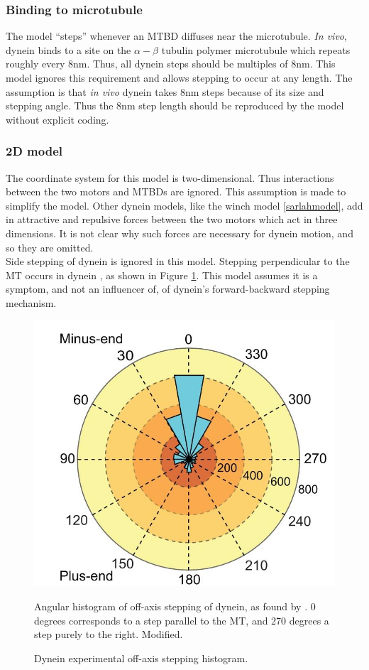 \documentclass[10pt]{article} %
\begin{document}
\subsubsection{Binding to microtubule}
The model ``steps'' whenever an MTBD diffuses near the microtubule. \textit{In vivo}, dynein binds to a site on the $\alpha-\beta$ tubulin polymer microtubule which repeats roughly every 8nm. Thus, all dynein steps should be multiples of $8$nm. This model ignores this requirement and allows stepping to occur at any length. The assumption is that \textit{in vivo} dynein takes 8nm steps because of its size and stepping angle. Thus the 8nm step length should be reproduced by the model without explicit coding.\\

\subsubsection{2D model}
The coordinate system for this model is two-dimensional. Thus interactions between the two motors and MTBDs are ignored. This assumption is made to simplify the model. Other dynein models, like the winch model \ref{sarlahmodel}, add in attractive and repulsive forces between the two motors which act in three dimensions. It is not clear why such forces are necessary for dynein motion, and so they are omitted.\\

Side stepping of dynein is ignored in this model. Stepping perpendicular to the MT occurs in dynein \cite{weihongppaer}, as shown in Figure \ref{fig:weihong-side-stepping}. This model assumes it is a symptom, and not an influencer of, of dynein's forward-backward stepping mechanism.

\begin{figure}[h]
  \centering
  \includegraphics[width=.45\textwidth]{../../figures/weihong-side-stepping}
  \caption{Dynein experimental off-axis stepping histogram.}{Angular histogram of off-axis stepping of dynein, as found by \cite{weihongpaper}. 0 degrees corresponds to a step parallel to the MT, and 270 degrees a step purely to the right. Modified.}
  \label{fig:weihong-side-stepping}
\end{figure}
\end{document}
